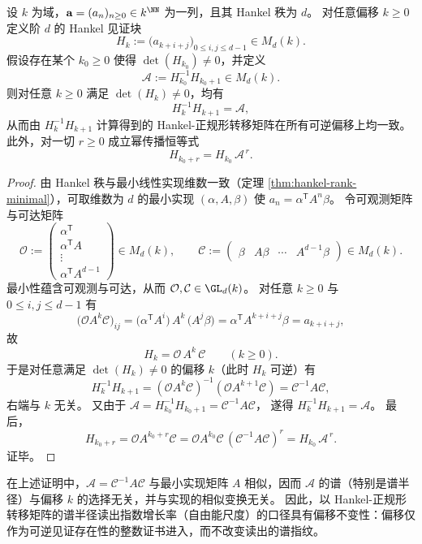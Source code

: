 \begin{theorem}\label{thm:pom-hankel-nf-shift-invariance-and-power-propagation}
设 \(k\) 为域，\(\mathbf a=(a_n)_{n\ge 0}\in k^{\NN}\) 为一列，且其 Hankel 秩为 \(d\)。
对任意偏移 \(k\ge 0\) 定义阶 \(d\) 的 Hankel 见证块
\[
H_k:=\bigl(a_{k+i+j}\bigr)_{0\le i,j\le d-1}\in M_d(k).
\]
假设存在某个 \(k_0\ge 0\) 使得 \(\det(H_{k_0})\neq 0\)，并定义
\[
\mathcal A:=H_{k_0}^{-1}H_{k_0+1}\in M_d(k).
\]
则对任意 \(k\ge 0\) 满足 \(\det(H_k)\neq 0\)，均有
\[
H_k^{-1}H_{k+1}=\mathcal A,
\]
从而由 \(H_k^{-1}H_{k+1}\) 计算得到的 Hankel-正规形转移矩阵在所有可逆偏移上均一致。
此外，对一切 \(r\ge 0\) 成立幂传播恒等式
\[
H_{k_0+r}=H_{k_0}\,\mathcal A^{\,r}.
\]
\end{theorem}
\begin{proof}
由 Hankel 秩与最小线性实现维数一致（定理 \ref{thm:hankel-rank-minimal}），可取维数为 \(d\) 的最小实现 \((\alpha,A,\beta)\) 使
\(
a_n=\alpha^{\mathsf T}A^n\beta
\)。
令可观测矩阵与可达矩阵
\[
\mathcal O:=
\begin{pmatrix}
\alpha^{\mathsf T}\\
\alpha^{\mathsf T}A\\
\vdots\\
\alpha^{\mathsf T}A^{d-1}
\end{pmatrix}\in M_d(k),
\qquad
\mathcal C:=
\begin{pmatrix}
\beta & A\beta & \cdots & A^{d-1}\beta
\end{pmatrix}\in M_d(k).
\]
最小性蕴含可观测与可达，从而 \(\mathcal O,\mathcal C\in\GL_d(k)\)。
对任意 \(k\ge 0\) 与 \(0\le i,j\le d-1\) 有
\[
\bigl(\mathcal O A^k \mathcal C\bigr)_{ij}
=\bigl(\alpha^{\mathsf T}A^i\bigr)\,A^k\,\bigl(A^j\beta\bigr)
=\alpha^{\mathsf T}A^{k+i+j}\beta
=a_{k+i+j},
\]
故
\[
H_k=\mathcal O\,A^k\,\mathcal C\qquad(k\ge 0).
\]
于是对任意满足 \(\det(H_k)\neq 0\) 的偏移 \(k\)（此时 \(H_k\) 可逆）有
\[
H_k^{-1}H_{k+1}
=(\mathcal O A^k \mathcal C)^{-1}(\mathcal O A^{k+1}\mathcal C)
=\mathcal C^{-1}A\mathcal C,
\]
右端与 \(k\) 无关。
又由于
\(
\mathcal A=H_{k_0}^{-1}H_{k_0+1}=\mathcal C^{-1}A\mathcal C
\)，
遂得 \(H_k^{-1}H_{k+1}=\mathcal A\)。
最后，
\[
H_{k_0+r}=\mathcal O A^{k_0+r}\mathcal C
=\mathcal O A^{k_0}\mathcal C\,(\mathcal C^{-1}A\mathcal C)^r
=H_{k_0}\,\mathcal A^{\,r}.
\]
证毕。
\end{proof}

\begin{remark}[谱半径读出与偏移选择的无关性]\label{rem:pom-hankel-nf-spectral-radius-offset-independence}
在上述证明中，\(\mathcal A=\mathcal C^{-1}A\mathcal C\) 与最小实现矩阵 \(A\) 相似，因而 \(\mathcal A\) 的谱（特别是谱半径）与偏移 \(k\) 的选择无关，并与实现的相似变换无关。
因此，以 Hankel-正规形转移矩阵的谱半径读出指数增长率（自由能尺度）的口径具有偏移不变性：偏移仅作为可逆见证存在性的整数证书进入，而不改变读出的谱指纹。
\end{remark}

